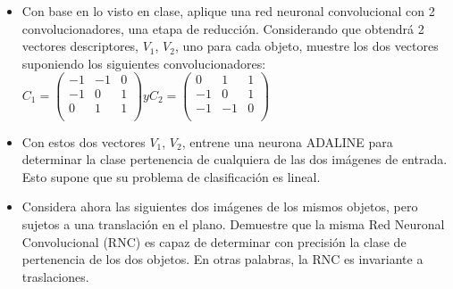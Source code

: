 \begin{itemize}
    \item Con base en lo visto en clase, aplique una red neuronal convolucional con 2 convolucionadores, una etapa de reducción. Considerando que obtendrá 2 vectores descriptores, $V_1$, $V_2$, uno para cada objeto, muestre los dos vectores suponiendo los siguientes convolucionadores:
    $C_1=\left(\begin{matrix}-1&-1&0\\-1&0&1\\0&1&1\\\end{matrix}\right) y C_2=\left(\begin{matrix}0&1&1\\-1&0&1\\-1&-1&0\\\end{matrix}\right)$
    \item Con estos dos vectores $V_1$, $V_2$, entrene una neurona ADALINE para determinar la clase pertenencia de cualquiera de las dos imágenes de entrada. Esto supone que su problema de clasificación es lineal.
    \item Considera ahora las siguientes dos imágenes de los mismos objetos, pero sujetos a una translación en el plano. Demuestre que la misma Red Neuronal Convolucional (RNC) es capaz de determinar con precisión la clase de pertenencia de los dos objetos. En otras palabras, la RNC es invariante a traslaciones.
\end{itemize}

